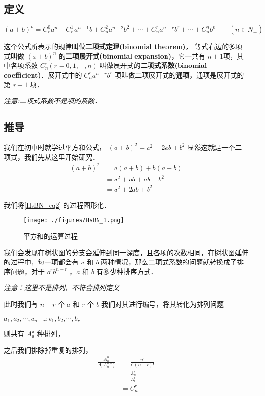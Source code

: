 

\subsection{定义}
\begin{equation}
(a + b)^n = C_n^0a^n + C_n^1a^{n- 1}b + C_n^2a^{n- 2}b^2 + \cdots + C_n^ra^{n-r}b^r + \cdots + C_n^nb^n \qquad (n\in N_{+})
\end{equation}

这个公式所表示的规律叫做\textbf{二项式定理(binomial theorem)}，
等式右边的多项式叫做 $(a+b)^n$ 的\textbf{二项展开式(binomial expansion)}，它一共有 $n+1$项，其中各项系数 $C_n^r(r = 0, 1, \cdots, n)$ 叫做展开式的\textbf{二项式系数(binomial coefficient)}．展开式中的 $C_n^ra^{n-r}b^r$ 项叫做二项展开式的\textbf{通项}，通项是展开式的第 $r+1$ 项．

\textsl{注意:二项式系数不是项的系数．}

\subsection{推导}
我们在初中时就学过平方和公式， $(a+b)^2 = a^2 + 2ab + b^2$ 显然这就是一个二项式，我们先从这里开始研究．
\begin{equation}\label{HsBN_eq2}
\begin{aligned}
(a+b)^2 &= a(a + b) + b(a + b)\\
&= a^2 + ab + ab + b^2\\
&= a^2 + 2ab + b^2
\end{aligned}
\end{equation}

我们将\autoref{HsBN_eq2} 的过程图形化．

\begin{figure}[ht]
\centering
\texttt{[image: ./figures/HsBN\_1.png]}
\caption{平方和的运算过程} \label{HsBN_fig1}
\end{figure}

我们会发现在树状图的分支会延伸到同一深度，且各项的次数相同，在树状图延伸的过程中，每一项都会有 $a$ 和 $b$ 两种情况，那么二项式系数的问题就转换成了排序问题，对于 $a^rb^{n-r}$ ，$a$ 和 $b$ 有多少种排序方式．

\textsl{注意：这里不是排列，不符合排列定义}

此时我们有 $n-r$ 个 $a$ 和 $r$ 个 $b$ 我们对其进行编号，将其转化为排列问题

$a_1,a_2,\cdots,a_{n-r};b_1,b_2,\cdots,b_r$

 
则共有 $A_n^n$ 种排列，

之后我们排除掉重复的排列，
\begin{equation}
\begin{aligned}
\frac{A_n^n}{A_r^rA_{n-r}^{n-r}} &= \frac{n!}{r!(n-r)!}\\
&= \frac{A_n^r}{A_r^r}\\
&= C_n^r
\end{aligned}
\end{equation}
